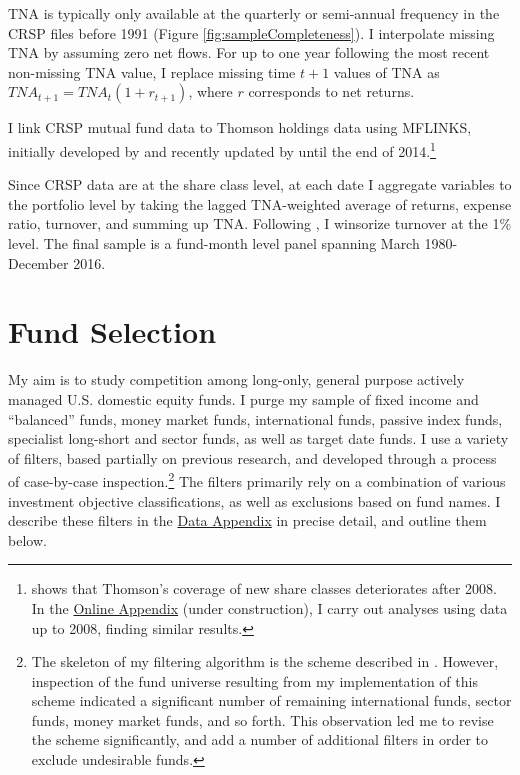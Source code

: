 \documentclass[openany]{book}
\let\rmarkdownfootnote\footnote%
\def\footnote{\protect\rmarkdownfootnote}
\theoremstyle{definition}
\theoremstyle{definition}
\theoremstyle{definition}
\theoremstyle{remark}
\begin{document}
TNA is typically only available at the quarterly or semi-annual
frequency in the CRSP files before 1991 (Figure
\ref{fig:sampleCompleteness}). I interpolate missing TNA by assuming
zero net flows. For up to one year following the most recent non-missing
TNA value, I replace missing time \(t+1\) values of TNA as
\(TNA_{t+1}=TNA_t(1+r_{t+1})\), where \(r\) corresponds to net returns.

I link CRSP mutual fund data to Thomson holdings data using MFLINKS,
initially developed by \citet{wermers00} and recently updated by
\citet{cx15} until the end of 2014.\footnote{\citet{zhu17} shows that
  Thomson's coverage of new share classes deteriorates after 2008. In
  the
  \href{https://www.dropbox.com/s/k7dygbn5slyrybc/Online_Appendix.pdf?dl=0}{Online
  Appendix} (under construction), I carry out analyses using data up to
  2008, finding similar results.}

Since CRSP data are at the share class level, at each date I aggregate
variables to the portfolio level by taking the lagged TNA-weighted
average of returns, expense ratio, turnover, and summing up TNA.
Following \citet{pst17}, I winsorize turnover at the 1\% level. The
final sample is a fund-month level panel spanning March 1980-December
2016.

\hypertarget{fund-selection}{%
\section{Fund Selection}\label{fund-selection}}

My aim is to study competition among long-only, general purpose actively
managed U.S. domestic equity funds. I purge my sample of fixed income
and ``balanced'' funds, money market funds, international funds, passive
index funds, specialist long-short and sector funds, as well as target
date funds. I use a variety of filters, based partially on previous
research, and developed through a process of case-by-case
inspection.\footnote{The skeleton of my filtering algorithm is the
  scheme described in \citet{ksz08}. However, inspection of the fund
  universe resulting from my implementation of this scheme indicated a
  significant number of remaining international funds, sector funds,
  money market funds, and so forth. This observation led me to revise
  the scheme significantly, and add a number of additional filters in
  order to exclude undesirable funds.} The filters primarily rely on a
combination of various investment objective classifications, as well as
exclusions based on fund names. I describe these filters in the
\href{https://www.dropbox.com/s/qugvhb8b0wqp0cg/LJ_JMP_Data_Appendix.pdf?dl=0}{Data
Appendix} in precise detail, and outline them below.
\end{document}
